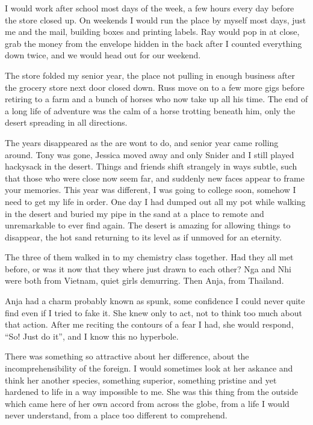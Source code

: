 \documentclass[ebook, 10pt, openright, onecolumn]{memoir}
\newcommand*\td[1]{
  \todo[inline]{
     #1 
  }
}
\newcommand*\finish{\td{ ----- Finish this section -----}}
\begin{document}
I would work after school most days of the week, a few hours every day before
the store closed up.  On weekends I would run the place by myself most days,
just me and the mail, building boxes and printing labels. Ray would pop in at
close, grab the money from the envelope hidden in the back after I counted
everything down twice, and we would head out for our weekend.

The store folded my senior year, the place not pulling in enough business after
the grocery store next door closed down.  Russ move on to a few more gigs before
retiring to a farm and a bunch of horses who now take up all his time.  The end
of a long life of adventure was the calm of a horse trotting beneath him, only
the desert spreading in all directions.

\finish

The years disappeared as the are wont to do, and senior year came rolling
around.  Tony was gone, Jessica moved away and only Snider and I still played
hackysack in the desert.  Things and friends shift strangely in ways subtle,
such that those who were close now seem far, and suddenly new faces appear to
frame your memories.  This year was different, I was going to college soon,
somehow I need to get my life in order.  One day I had dumped out all my pot
while walking in the desert and buried my pipe in the sand at a place to remote
and unremarkable to ever find again.  The desert is amazing for allowing things
to disappear, the hot sand returning to its level as if unmoved for an
eternity.

\finish{}

The three of them walked in to my chemistry class together.  Had they all met
before, or was it now that they where just drawn to each other? Nga and Nhi were
both from Vietnam, quiet girls demurring. Then Anja, from Thailand.

Anja had a charm probably known as spunk, some confidence I could never quite
find even if I tried to fake it. She knew only to act, not to think too much
about that action.  After me reciting the contours of a fear I had, she would
respond, ``So! Just do it'', and I know this no hyperbole.

There was something so attractive about her difference, about the
incomprehensibility of the foreign.  I would sometimes look at her askance and
think her another species, something superior, something pristine and yet
hardened to life in a way impossible to me.  She was this thing from the outside
which came here of her own accord from across the globe, from a life I would
never understand, from a place too different to comprehend.   
\end{document}
